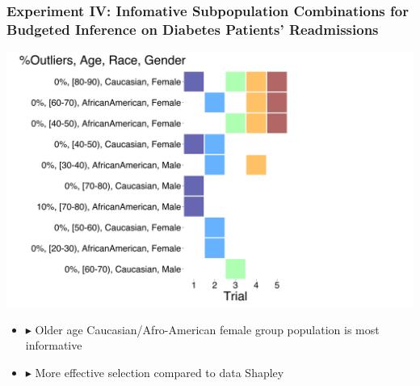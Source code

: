 \documentclass[hyperref={colorlinks = true},unknownkeysallowed]{beamer}
\let\oldcitep=\citep
\renewcommand\citep[1]{\hypersetup{linkcolor=darkred}\hyperlink{#1}{\oldcitep{#1}}}
\begin{document}
\begin{frame}
	\frametitle{Experiment IV: Infomative Subpopulation Combinations for Budgeted Inference on Diabetes Patients' Readmissions}
	\centering
	\includegraphics[width=.58\textwidth]{figs/selected_groups.png}	
	\begin{itemize}
		\item $\blacktriangleright$ Older age Caucasian/Afro-American female group population is most informative ~\citep{ghorbani19}
		\item $\blacktriangleright$ More effective selection compared to data Shapley~\citep{shapley53}
	\end{itemize}
\end{frame}

\end{document}
